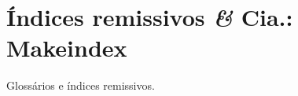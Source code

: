 \section{Índices remissivos {\it \&} Cia.:
  Makeindex}\label{sec:indice-glossario}

Glossários e índices remissivos.
